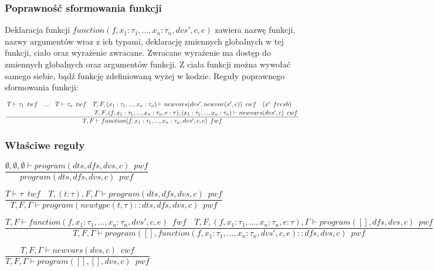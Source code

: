 \documentclass{article}
\begin{document}
\subsubsection{Poprawność sformowania funkcji}
Deklaracja funkcji $function(f, x_1 : \tau_1, ..., x_n : \tau_n, dvs', c, e)$ zawiera nazwę funkcji, nazwy argumentów wraz z ich typami, deklarację zmiennych globalnych w tej funkcji, ciało oraz wyrażenie zwracane. Zwracane wyrażenie ma dostęp do zmiennych globalnych oraz argumentów funkcji. Z ciała funkcji można wywołać samego siebie, bądź funkcję zdefiniowaną wyżej w kodzie. Reguły poprawnego sformowania funkcji:\newline

\centerline{$\dfrac{\splitdfrac{T \vdash \tau_1 \enspace twf \quad ... \quad T \vdash \tau_n \enspace twf \quad T, F, (x_1 : \tau_1, ..., x_n : \tau_n) \vdash newvars(dvs', newvar(x', e)) \enspace cwf \quad (x' \enspace fresh)} {\quad T, F, (f, x_1 : \tau_1, ..., x_n : \tau_n, e : \tau), (x_1 : \tau_1, ..., x_n : \tau_n) \vdash newvars(dvs', c) \enspace cwf}}{T, F \vdash function(f, x_1 : \tau_1, ..., x_n : \tau_n, dvs', c, e) \enspace fwf}$}\vspace{5pt}

\subsubsection{Właściwe reguły}
\centerline{$\dfrac{\emptyset, \emptyset, \emptyset \vdash program(dts, dfs, dvs, c) \enspace pwf}{program(dts, dfs, dvs, c) \enspace pwf}$}\vspace{5pt}

\centerline{$\dfrac{T \vdash \tau \enspace twf \quad T, (t : \tau), F, \Gamma \vdash program(dts, dfs, dvs, c) \enspace pwf}{T, F, \Gamma \vdash program(newtype(t, \tau) :: dts, dfs, dvs, c) \enspace pwf}$}\vspace{5pt}

\centerline{$\dfrac{T, F \vdash function(f, x_1 : \tau_1, ..., x_n : \tau_n, dvs', c, e) \enspace fwf \quad T, F, (f, x_1 : \tau_1, ..., x_n : \tau_n, e : \tau), \Gamma 
\vdash program([], dfs, dvs, c) \enspace pwf}{T, F, \Gamma \vdash program([], function(f, x_1 : \tau_1, ..., x_n : \tau_n, dvs', c, e) :: dfs, dvs, c) \enspace pwf}$}\vspace{5pt} 

\centerline{$\dfrac{T, F, \Gamma \vdash newvars(dvs, c) \enspace cwf }{T, F, \Gamma \vdash program([], [], dvs, c) \enspace pwf}$}\vspace{5pt} 
\end{document}
